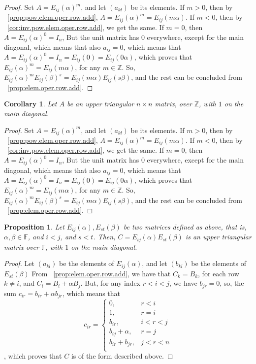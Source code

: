\documentclass[12pt]{article}
\newtheorem{proposition}[theorem]{Proposition}
\newtheorem{corollary}[theorem]{Corollary}
\begin{document}
\begin{proof}
Set $A=E_{ij}(\alpha)^m$, and let $(a_{kl})$ be its elements.
If $m>0$, then by ~\ref{prop:pow.elem.oper.row.add}, $A=E_{ij}(\alpha)^m=E_{ij}(m\alpha)$. If $m<0$, then by ~\ref{cor:inv.pow.elem.oper.row.add}, we get the same. If $m=0$, then $A=E_{ij}(\alpha)^0=I_n$, But the unit matrix has $0$ everywhere, except for the main diagonal, which means that also $a_{ij}=0$, which means that $A=E_{ij}(\alpha)^0=I_n=E_{ij}(0)=E_{ij}(0\alpha)$, which proves that $E_{ij}(\alpha)^m=E_{ij}(m\alpha)$, for any $m \in \mathbb{Z}$. So, $E_{ij}(\alpha)^m E_{ij}(\beta)^s=E_{ij}(m\alpha) E_{ij}(s\beta)$, and the rest can be concluded from ~\ref{prop:elem.oper.row.add}.
\end{proof}
\begin{corollary}
Let $A$ be an upper triangular $n \times n$ matrix, over $\mathbb{Z}$, with $1$ on the main diagonal.
\end{corollary}
\begin{proof}
Set $A=E_{ij}(\alpha)^m$, and let $(a_{kl})$ be its elements.
If $m>0$, then by ~\ref{prop:pow.elem.oper.row.add}, $A=E_{ij}(\alpha)^m=E_{ij}(m\alpha)$. If $m<0$, then by ~\ref{cor:inv.pow.elem.oper.row.add}, we get the same. If $m=0$, then $A=E_{ij}(\alpha)^0=I_n$, But the unit matrix has $0$ everywhere, except for the main diagonal, which means that also $a_{ij}=0$, which means that $A=E_{ij}(\alpha)^0=I_n=E_{ij}(0)=E_{ij}(0\alpha)$, which proves that $E_{ij}(\alpha)^m=E_{ij}(m\alpha)$, for any $m \in \mathbb{Z}$. So, $E_{ij}(\alpha)^m E_{ij}(\beta)^s=E_{ij}(m\alpha) E_{ij}(s\beta)$, and the rest can be concluded from ~\ref{prop:elem.oper.row.add}.
\end{proof}
\begin{proposition} \label{prop:elem.oper.row.add.mult.closed}
Let $E_{ij}(\alpha),E_{st}(\beta)$ be two matrices defined as above, that is, $\alpha,\beta \in \mathbb{F}$, and $i<j$, and $s<t$. Then, $C=E_{ij}(\alpha)E_{st}(\beta)$ is an upper triangular matrix over $\mathbb{F}$, with $1$ on the main diagonal.
\end{proposition}
\begin{proof}
Let $(a_{kl})$ be the elements of $E_{ij}(\alpha)$, and let $(b_{kl})$ be the elements of $E_{st}(\beta)$
From ~\ref{prop:elem.oper.row.add}, we have that $C_k=B_k$, for each row $k \neq i$, and $C_i=B_i+\alpha B_j$. But, for any index $r<i<j$, we have $b_{jr}=0$, so, the sum $c_{ir}=b_{ir}+\alpha b_{jr}$, which means that $$
c_{ir}=\begin{cases}
		0, & r<i\\
            1, & r=i\\
            b_{ir}, & i<r<j \\
            b_{ij}+\alpha, & r=j\\
            b_{ir}+b_{jr}, & j<r<n\\
		 \end{cases}
$$, which proves that $C$ is of the form described above.
\end{proof}
\end{document}

